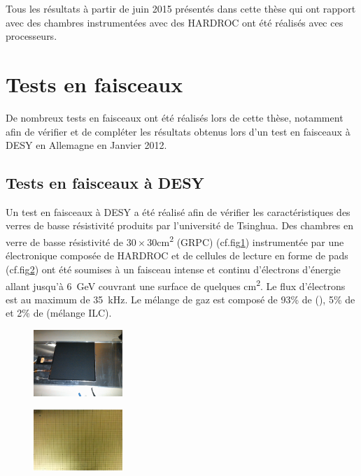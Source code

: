  Tous les résultats à partir de juin 2015 présentés dans cette thèse qui ont rapport avec des chambres instrumentées avec des HARDROC ont été réalisés avec ces processeurs.

\section{Tests en faisceaux}
De nombreux tests en faisceaux ont été réalisés lors de cette thèse, notamment afin de vérifier et de compléter les résultats obtenus lors d'un test en faisceaux à DESY en Allemagne en Janvier 2012.
\subsection{Tests en faisceaux à DESY}
Un test en faisceaux à DESY \cite{Haddad:2012fx} a été réalisé afin de vérifier les caractéristiques des verres de basse résistivité produits par l'université de Tsinghua. Des chambres en verre de basse résistivité de $30\times30$\si{\square\centi\meter} (GRPC) (cf.fig\ref{chambre}) instrumentée par une électronique composée de HARDROC et de cellules de lecture en forme de pads (cf.fig\ref{cellule}) ont été soumises à un faisceau intense et continu d'électrons d'énergie allant jusqu'à \SI{6}{\giga\eV} couvrant une surface de quelques \si{\square\centi\meter}. Le flux d'électrons est au maximum de \SI{35}{\kilo\hertz}. Le mélange de gaz est composé de 93\% de (), 5\% de  et 2\% de  (mélange ILC).
\begin{figure}[ht!]
	\centering
	\includegraphics[width=0.3\textwidth]{GLA/chambre.png}
	\label{chambre}
\end{figure}
\begin{figure}[ht!]
	\centering
	\includegraphics[width=0.3\textwidth]{GLA/cellules.jpg}
	\label{cellule}
\end{figure}

